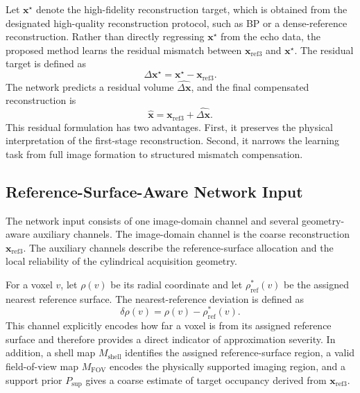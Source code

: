 \documentclass[journal]{IEEEtran}
\begin{document}
Let $\mathbf{x}^{\star}$ denote the high-fidelity reconstruction target, which is obtained from the designated high-quality reconstruction protocol, such as BP or a dense-reference reconstruction. Rather than directly regressing $\mathbf{x}^{\star}$ from the echo data, the proposed method learns the residual mismatch between $\mathbf{x}_{\mathrm{ref3}}$ and $\mathbf{x}^{\star}$. The residual target is defined as
\begin{equation}
\Delta \mathbf{x}^{\star}=\mathbf{x}^{\star}-\mathbf{x}_{\mathrm{ref3}}.
\label{eq:residual_target}
\end{equation}
The network predicts a residual volume $\widehat{\Delta \mathbf{x}}$, and the final compensated reconstruction is
\begin{equation}
\widehat{\mathbf{x}}=\mathbf{x}_{\mathrm{ref3}}+\widehat{\Delta \mathbf{x}}.
\label{eq:final_reconstruction}
\end{equation}
This residual formulation has two advantages. First, it preserves the physical interpretation of the first-stage reconstruction. Second, it narrows the learning task from full image formation to structured mismatch compensation.

\subsection{Reference-Surface-Aware Network Input}
\label{subsec:network_input}

The network input consists of one image-domain channel and several geometry-aware auxiliary channels. The image-domain channel is the coarse reconstruction $\mathbf{x}_{\mathrm{ref3}}$. The auxiliary channels describe the reference-surface allocation and the local reliability of the cylindrical acquisition geometry.

For a voxel $v$, let $\rho(v)$ be its radial coordinate and let $\rho^{\ast}_{\mathrm{ref}}(v)$ be the assigned nearest reference surface. The nearest-reference deviation is defined as
\begin{equation}
\delta\rho(v)=\rho(v)-\rho^{\ast}_{\mathrm{ref}}(v).
\label{eq:nearest_deviation}
\end{equation}
This channel explicitly encodes how far a voxel is from its assigned reference surface and therefore provides a direct indicator of approximation severity. In addition, a shell map $M_{\mathrm{shell}}$ identifies the assigned reference-surface region, a valid field-of-view map $M_{\mathrm{FOV}}$ encodes the physically supported imaging region, and a support prior $P_{\mathrm{sup}}$ gives a coarse estimate of target occupancy derived from $\mathbf{x}_{\mathrm{ref3}}$.
\end{document}

